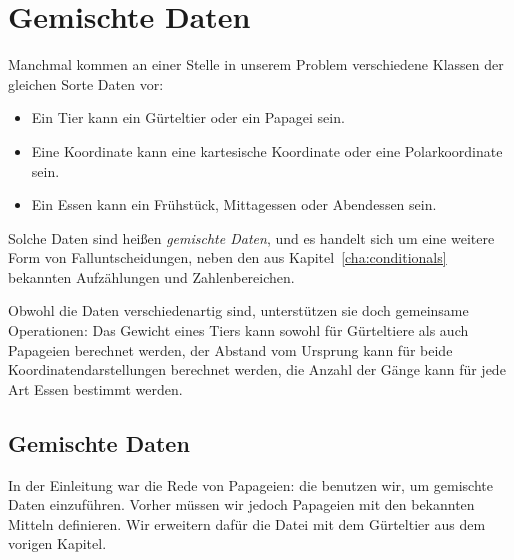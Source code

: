 
\chapter{Gemischte Daten}
\label{cha:gemischte-daten}

Manchmal kommen an einer Stelle in unserem Problem verschiedene
Klassen der gleichen Sorte Daten vor:
%
\begin{itemize}
\item Ein Tier kann ein Gürteltier oder ein Papagei sein.
\item Eine Koordinate kann eine kartesische Koordinate oder eine
  Polarkoordinate sein.
\item Ein Essen kann ein Frühstück, Mittagessen oder Abendessen sein.
\end{itemize}
%
Solche Daten sind heißen \textit{gemischte Daten}, und es handelt sich um eine weitere Form von
Falluntscheidungen, neben den aus Kapitel~\ref{cha:conditionals}
bekannten Aufzählungen und Zahlenbereichen.

Obwohl die Daten verschiedenartig sind, unterstützen sie doch
gemeinsame Operationen: Das Gewicht eines Tiers kann sowohl für
Gürteltiere als auch Papageien berechnet werden, der Abstand vom
Ursprung kann für beide Koordinatendarstellungen berechnet werden, die
Anzahl der Gänge kann für jede Art Essen bestimmt werden.

\section{Gemischte Daten}
\label{sec:mixed-data}
\label{sec:animal}

In der Einleitung war die Rede von Papageien: die benutzen wir, um
gemischte Daten einzuführen.  Vorher müssen wir jedoch Papageien mit den bekannten
Mitteln definieren.  Wir erweitern dafür die Datei mit dem Gürteltier
aus dem vorigen Kapitel.

